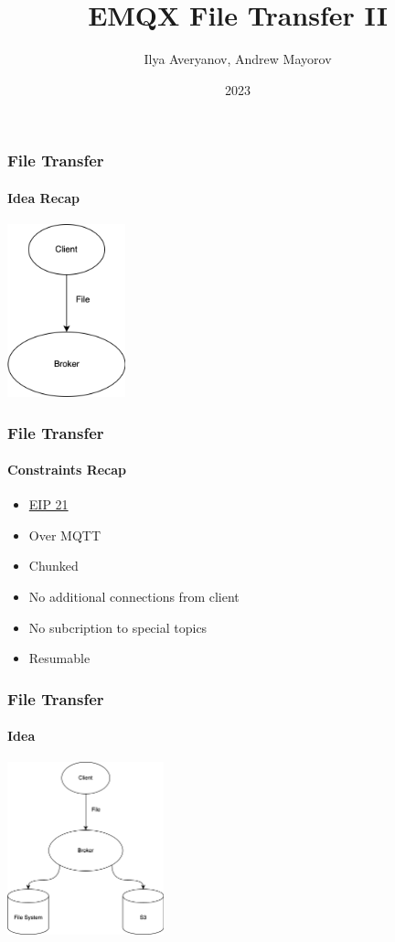 \documentclass{beamer}
\title{EMQX File Transfer II}
\author{Ilya Averyanov, Andrew Mayorov}
\institute{EMQX}
\date{2023}
\begin{document}
\frame{\titlepage}

\begin{frame}
    \frametitle{File Transfer}
    \framesubtitle{Idea Recap}

    \begin{center}
        \includegraphics[height=5cm, keepaspectratio]{images/idea_naive.png}
    \end{center}
\end{frame}

\begin{frame}
    \frametitle{File Transfer}
    \framesubtitle{Constraints Recap}

    \begin{center}
        \begin{itemize}
            \item \href{https://github.com/emqx/eip/blob/main/active/0021-transfer-files-over-mqtt.md}{EIP 21}
            \item Over MQTT
            \item Chunked
            \item No additional connections from client
            \item No subcription to special topics
            \item Resumable
        \end{itemize}
    \end{center}
\end{frame}


\begin{frame}
    \frametitle{File Transfer}
    \framesubtitle{Idea}

    \begin{center}
        \includegraphics[height=5cm, keepaspectratio]{images/idea.png}
    \end{center}
\end{frame}
\end{document}
